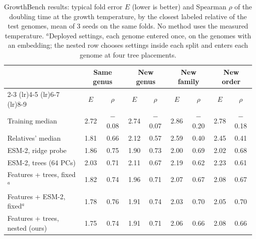 \begin{table}[t]\centering\small\setlength{\tabcolsep}{4pt}
\caption{GrowthBench results: typical fold error $E$ (lower is better) and Spearman $\rho$ of the doubling time at the growth temperature, by the closest labeled relative of the test genomes, mean of 3 seeds on the same folds. No method uses the measured temperature. $^{a}$Deployed settings, each genome entered once, on the genomes with an embedding; the nested row chooses settings inside each split and enters each genome at four tree placements.}\label{tab:benchmark}
\begin{tabular}{lcccccccc}
\toprule
& \multicolumn{2}{c}{Same genus} & \multicolumn{2}{c}{New genus} & \multicolumn{2}{c}{New family} & \multicolumn{2}{c}{New order} \\
\cmidrule(lr){2-3} \cmidrule(lr){4-5} \cmidrule(lr){6-7} \cmidrule(lr){8-9}
& $E$ & $\rho$ & $E$ & $\rho$ & $E$ & $\rho$ & $E$ & $\rho$ \\
\midrule
Training median & 2.72 & $-$0.08 & 2.74 & $-$0.07 & 2.86 & $-$0.20 & 2.78 & $-$0.18 \\
Relatives' median & 1.81 & 0.66 & 2.12 & 0.57 & 2.59 & 0.40 & 2.45 & 0.41 \\
\midrule
ESM-2, ridge probe & 1.86 & 0.75 & 1.90 & 0.73 & 2.00 & 0.69 & 2.02 & 0.68 \\
ESM-2, trees (64 PCs) & 2.03 & 0.71 & 2.11 & 0.67 & 2.19 & 0.62 & 2.23 & 0.61 \\
\midrule
Features + trees, fixed$^{a}$ & 1.82 & 0.74 & 1.96 & 0.71 & 2.07 & 0.67 & 2.08 & 0.67 \\
Features + ESM-2, fixed$^{a}$ & 1.78 & 0.76 & 1.91 & 0.74 & 2.03 & 0.70 & 2.05 & 0.70 \\
Features + trees, nested (ours) & 1.75 & 0.74 & 1.91 & 0.71 & 2.06 & 0.66 & 2.08 & 0.66 \\
\bottomrule
\end{tabular}
\end{table}
